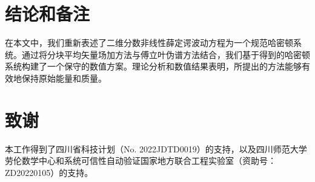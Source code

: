 \documentclass[preprint,compress,3p,10pt,fleqn]{elsarticle}
\numberwithin{equation}{section}
\begin{document}
	\section{结论和备注}\label{Section 5}

在本文中，我们重新表述了二维分数非线性薛定谔波动方程为一个规范哈密顿系统。通过将分块平均矢量场加方法与傅立叶伪谱方法结合，我们基于得到的哈密顿系统构建了一个保守的数值方案。理论分析和数值结果表明，所提出的方法能够有效地保持原始能量和质量。

\section*{致谢}

本工作得到了四川省科技计划（No. 2022JDTD0019）的支持，以及四川师范大学劳伦数学中心和系统可信性自动验证国家地方联合工程实验室（资助号：ZD20220105）的支持。
	



% 
% 

\end{document}
